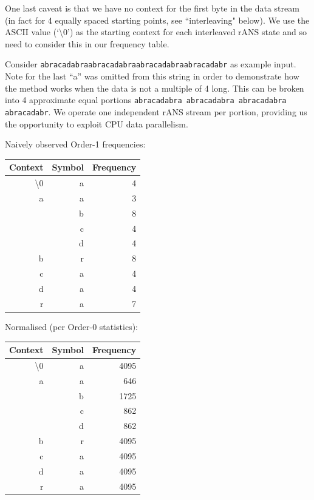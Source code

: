 \documentclass[a4paper]{article}
\begin{document}
One last caveat is that we have no context for the first byte in the
data stream (in fact for 4 equally spaced starting points, see
``interleaving" below).  We use the ASCII value (`\textbackslash0') as
the starting context for each interleaved rANS state and so need to
consider this in our frequency table.

Consider \texttt{abracadabraabracadabraabracadabraabracadabr} as
example input.  Note for the last ``a'' was omitted from this string
in order to demonstrate how the method works when the data is not a
multiple of 4 long.  This can be broken into 4 approximate equal
portions \texttt{abracadabra abracadabra abracadabra abracadabr}.  We
operate one independent rANS stream per portion, providing us the
opportunity to exploit CPU data parallelism.

\begin{minipage}[t]{0.5\textwidth}
Naively observed Order-1 frequencies:
\\[8pt]
\begin{tabular}{ |r|r|r| }
\hline
Context & Symbol & Frequency\\
\hline
\textbackslash0 & a & 4 \\
\hline
a & a & 3 \\
  & b & 8 \\
  & c & 4 \\
  & d & 4 \\
\hline
b & r & 8 \\
\hline
c & a & 4 \\
\hline
d & a & 4 \\
\hline
r & a & 7 \\
\hline
\end{tabular}
\end{minipage}
\begin{minipage}[t]{0.5\textwidth}
Normalised (per Order-0 statistics):
\\[8pt]
\begin{tabular}{ |r|r|r|}
\hline
Context & Symbol & Frequency\\
\hline
\textbackslash0 & a & 4095 \\
\hline
a & a &  646 \\
  & b & 1725 \\
  & c &  862 \\
  & d &  862 \\
\hline
b & r & 4095 \\
\hline
c & a & 4095 \\
\hline
d & a & 4095 \\
\hline
r & a & 4095 \\
\hline
\end{tabular}
\end{minipage}
\end{document}
